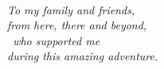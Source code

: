 \pagestyle{empty}
\,
\vfill
\begin{flushright}
\textit{To my family and friends, \\ from here, there and beyond, \\ who supported me \\ during this amazing adventure.}
\end{flushright}
\vfill
\,
